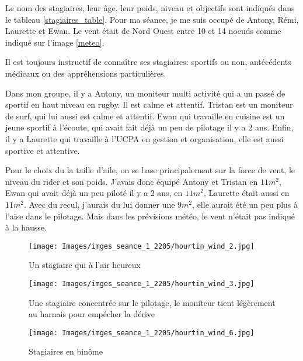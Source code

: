 \documentclass[11pt,a4paper]{report}
\begin{document}
Le nom des stagiaires, leur \^age, leur poids, niveau et objectifs sont
indiqués dans le tableau \ref{stagiaires_table}.
Pour ma séance, je me suis occupé de Antony, Rémi, Laurette et Ewan.
 Le vent était de Nord Ouest entre 
10 et 14 noeuds comme indiqué sur l'image \ref{meteo}.

Il est toujours instructif de connaître ses stagiaires: 
sportifs ou non, antécédents médicaux ou des appréhensions particulières.

Dans mon groupe, il y a Antony, un moniteur multi activité qui a un passé 
de sportif en haut niveau en rugby. Il est calme et attentif.
Tristan est un moniteur de surf, qui lui aussi est calme et attentif.
Ewan qui travaille en cuisine est un jeune sportif à l'écoute, qui avait 
fait déjà un peu de pilotage il y a 2 ans.
Enfin, il y a Laurette qui travaille à l'UCPA en gestion et 
organisation, elle est aussi  sportive et attentive.

Pour le choix du la taille d'aile, on se base principalement sur la force
de vent, le niveau du rider et son poids. J'avais donc équipé Antony et Tristan
en $11 m^2$, Ewan qui avait déjà un peu piloté il y a 2 ans, en $11 m^2$,
 Laurette était aussi en $11 m^2$.
Avec du recul, j'aurais du lui donner une  $9 m^2$, elle aurait été un peu plus
à l'aise dans le pilotage. Mais dans les prévisions météo, le vent n'était pas
indiqué à la hausse.

\begin{figure}
\begin{minipage}{0.4\textwidth}
\texttt{[image: Images/imges\_seance\_1\_2205/hourtin\_wind\_2.jpg]} 
\caption{Un stagiaire qui à l'air heureux}
\end{minipage}
\hfill
\begin{minipage}{0.4\textwidth}
\texttt{[image: Images/imges\_seance\_1\_2205/hourtin\_wind\_3.jpg]} 
\caption{Une stagiaire concentrée sur le pilotage, le moniteur tient légèrement
au harnais pour emp\'echer la dérive}
\end{minipage}
\end{figure}

\begin{figure}
\texttt{[image: Images/imges\_seance\_1\_2205/hourtin\_wind\_6.jpg]}
\caption{Stagiaires en bin\^ome} 
\end{figure}
\end{document}
